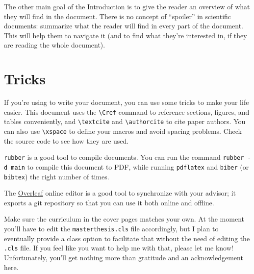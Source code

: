 The other main goal of the Introduction is to give the reader an overview of what they will
find in the document. There is no concept of ``spoiler'' in scientific documents: summarize
what the reader will find in every part of the document. This will help them to navigate it
(and to find what they're interested in, if they are reading the whole document).

\section{\latex Tricks}

If you're using \latex to write your document, you can use some tricks to make your life
easier. This document uses the \verb|\Cref| command to reference sections, figures, and tables conveniently, and \verb|\textcite| and
\verb|\authorcite| to cite paper authors. You can also use \verb|\xspace| to define your macros
and avoid spacing problems. Check the source code to see how they are used.

\texttt{rubber} is a good tool to compile \latex documents. You can run the command
\texttt{rubber -d main} to compile this document to PDF, while running \texttt{pdflatex}
and \texttt{biber} (or \texttt{bibtex}) the right number of times.

The \href{https://www.overleaf.com}{Overleaf} online editor is a good tool to synchronize with
your advisor; it exports a git repository so that you can use it both online and offline.

Make sure the curriculum in the cover pages matches your own. At the moment you'll have to edit the \texttt{masterthesis.cls} file accordingly, but I plan to eventually provide a class option to facilitate that without the need of editing the \texttt{.cls} file. If you feel like you want to help me with that, please let me know! Unfortunately, you'll get nothing more than gratitude and an acknowledgement here.

